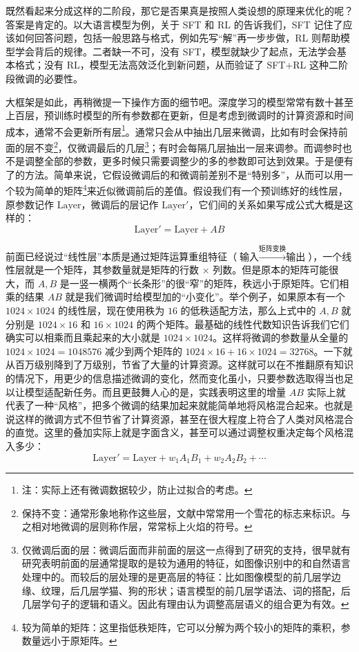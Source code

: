 既然看起来分成这样的二阶段，那它是否果真是按照人类设想的原理来优化的呢？答案是肯定的。以大语言模型为例，关于 SFT 和 RL 的告诉我们，SFT 记住了应该如何回答问题，包括一般思路与格式，例如先写“解”再一步步做，RL 则帮助模型学会背后的规律。二者缺一不可，没有 SFT，模型就缺少了起点，无法学会基本格式；没有 RL，模型无法高效泛化到新问题，从而验证了 SFT+RL 这种二阶段微调的必要性。

大框架是如此，再稍微提一下操作方面的细节吧。深度学习的模型常常有数十甚至上百层，预训练时模型的所有参数都在更新，但是考虑到微调时的计算资源和时间成本，通常不会更新所有层\footnote{注：实际上还有微调数据较少，防止过拟合的考虑。}。通常只会从中抽出几层来微调，比如有时会保持前面的层不变\footnote{保持不变：通常形象地称作这些层，文献中常常用一个雪花的标志来标识。与之相对地微调的层则称作层，常常标上火焰的符号。}，仅微调最后的几层\footnote{仅微调后面的层：微调后面而非前面的层这一点得到了研究的支持，很早就有研究表明前面的层通常提取的是较为通用的特征，如图像识别中的和自然语言处理中的。而较后的层处理的是更高层的特征：比如图像模型的前几层学边缘、纹理，后几层学猫、狗的形状；语言模型的前几层学语法、词的搭配，后几层学句子的逻辑和语义。因此有理由认为调整高层语义的组合更为有效。}；有时会每隔几层抽出一层来调参。而调参时也不是调整全部的参数，更多时候只需要调整少的多的参数即可达到效果。于是便有了的方法。简单来说，它假设微调后的和微调前差别不是“特别多”，从而可以用一个较为简单的矩阵\footnote{较为简单的矩阵：这里指低秩矩阵，它可以分解为两个较小的矩阵的乘积，参数量远小于原矩阵。}来近似微调前后的差值。假设我们有一个预训练好的线性层，原参数记作 $\text{Layer}$，微调后的层记作 $\text{Layer}'$，它们间的关系如果写成公式大概是这样的：
\[
    \text{Layer}' = \text{Layer} + AB
\]

前面已经说过“线性层”本质是通过矩阵运算重组特征（$\text{输入}\xrightarrow{\text{矩阵变换}}\text{输出}$），一个线性层就是一个矩阵，其参数量就是矩阵的行数 × 列数。但是原本的矩阵可能很大，而 $A,B$ 是一竖一横两个“长条形”的很“窄”的矩阵，秩远小于原矩阵。它们相乘的结果 $AB$ 就是我们微调时给模型加的“小变化”。举个例子，如果原本有一个 $1024 \times 1024$ 的线性层，现在使用秩为 $16$ 的低秩适配方法，那么上式中的 $A,B$ 就分别是 $1024 \times 16$ 和 $16\times 1024$ 的两个矩阵。最基础的线性代数知识告诉我们它们确实可以相乘而且乘起来的大小就是 $1024\times 1024$。这样将微调的参数量从全量的 $1024 \times 1024 = 1048576$ 减少到两个矩阵的 $1024 \times 16 + 16 \times 1024 = 32768$。一下就从百万级别降到了万级别，节省了大量的计算资源。这样就可以在不推翻原有知识的情况下，用更少的信息描述微调的变化，然而变化虽小，只要参数选取得当也足以让模型适配新任务。而且更鼓舞人心的是，实践表明这里的增量 $AB$ 实际上就代表了一种“风格”，把多个微调的结果加起来就能简单地将风格混合起来。也就是说这样的微调方式不但节省了计算资源，甚至在很大程度上符合了人类对风格混合的直觉。这里的叠加实际上就是字面含义，甚至可以通过调整权重决定每个风格混入多少：
\[
    \text{Layer}' = \text{Layer} + w_1 A_1B_1 + w_2 A_2B_2 + \cdots
\]

